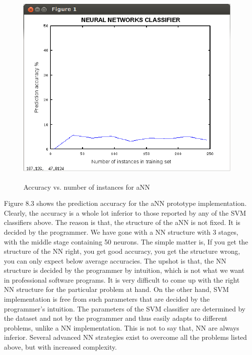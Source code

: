 \documentclass[11pt,a4paper]{report}
\begin{document}
{\begin{figure}[H]
\begin{center}
\includegraphics[width=13cm, height=10cm]{nn.png}
\captionsetup{width=13cm}
\caption{Accuracy vs. number of instances for aNN}
\end{center}
\end{figure}

Figure 8.3 shows the prediction accuracy for the aNN prototype implementation. Clearly, the accuracy is a whole lot inferior to those reported by any of the SVM classifiers above. The reason is that, the structure of the aNN is not fixed. It is decided by the programmer. We have gone with a NN structure with 3 stages, with the middle stage containing 50 neurons. The simple matter is, If you  get the structure of the NN right, you get good accuracy, you get the structure wrong, you can only expect below average accuracies. The upshot is that, the NN structure is decided by the programmer by intuition, which is not what we want in professional software programs. It is very difficult to come up with the right NN structure for the particular problem at hand. On the other hand, SVM implementation is free from such parameters that are decided by the programmer's intuition. The parameters of the SVM classifier are determined by the dataset and not by the programmer and thus easily adapts to different problems, unlike a NN implementation. This is not to say that, NN are always inferior. Several advanced NN strategies exist to overcome all the problems listed above, but with increased complexity.\\

}
\end{document}
